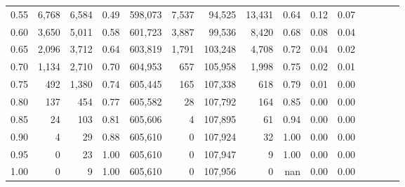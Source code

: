 \begin{tabular}{rrrcrrrrrrrrrrr}
0.55 &    6,768 &   6,584 &                                       0.49 &  598,073 &    7,537 &   94,525 &   13,431 &  0.64 &  0.12 &                         0.07 \\
0.60 &    3,650 &   5,011 &                                       0.58 &  601,723 &    3,887 &   99,536 &    8,420 &  0.68 &  0.08 &                         0.04 \\
0.65 &    2,096 &   3,712 &                                       0.64 &  603,819 &    1,791 &  103,248 &    4,708 &  0.72 &  0.04 &                         0.02 \\
0.70 &    1,134 &   2,710 &                                       0.70 &  604,953 &      657 &  105,958 &    1,998 &  0.75 &  0.02 &                         0.01 \\
0.75 &      492 &   1,380 &                                       0.74 &  605,445 &      165 &  107,338 &      618 &  0.79 &  0.01 &                         0.00 \\
0.80 &      137 &     454 &                                       0.77 &  605,582 &       28 &  107,792 &      164 &  0.85 &  0.00 &                         0.00 \\
0.85 &       24 &     103 &                                       0.81 &  605,606 &        4 &  107,895 &       61 &  0.94 &  0.00 &                         0.00 \\
0.90 &        4 &      29 &                                       0.88 &  605,610 &        0 &  107,924 &       32 &  1.00 &  0.00 &                         0.00 \\
0.95 &        0 &      23 &                                       1.00 &  605,610 &        0 &  107,947 &        9 &  1.00 &  0.00 &                         0.00 \\
1.00 &        0 &       9 &                                       1.00 &  605,610 &        0 &  107,956 &        0 &   nan &  0.00 &                         0.00 \\
\bottomrule
\end{tabular}
